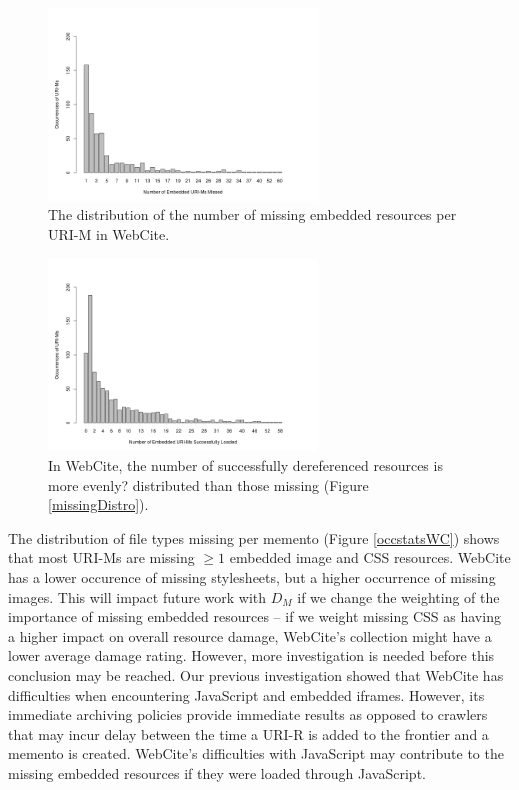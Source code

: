 \begin{figure}[h!]
\includegraphics[width=270px]{./imgs/OccStats_webcite.png}
\caption{The distribution of the number of missing embedded resources per URI-M in WebCite.}
\label{missingDistroWC}
\end{figure}


\begin{figure}[h!]
\includegraphics[width=270px]{./imgs/OccStatsFound_webcite.png}
\caption{In WebCite, the number of successfully dereferenced resources is more {\color{red}evenly?} distributed than those missing (Figure \ref{missingDistro}).}
\label{foundDistroWC}
\end{figure}



The distribution of file types missing per memento (Figure \ref{occstatsWC}) shows that most URI-Ms are missing $\ge 1$ embedded image and CSS resources. WebCite has a lower occurence of missing stylesheets, but a higher occurrence of missing images. This will impact future work with $D_M$ if we change the weighting of the importance of missing embedded resources -- if we weight missing CSS as having a higher impact on overall resource damage, WebCite's collection might have a lower average damage rating. However, more investigation is needed before this conclusion may be reached. 
Our previous investigation \cite{ijdl} showed that WebCite has difficulties when encountering JavaScript and embedded iframes. However, its immediate archiving policies provide immediate results as opposed to crawlers that may incur delay between the time a URI-R is added to the frontier and a memento is created. WebCite's difficulties with JavaScript may contribute to the missing embedded resources if they were loaded through JavaScript.


